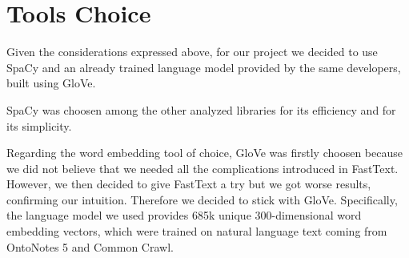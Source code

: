 \section{Tools Choice}

Given the considerations expressed above, for our project we decided to use SpaCy and an already trained language model provided by the same developers, built using GloVe.

SpaCy was choosen among the other analyzed libraries for its efficiency and for its simplicity. 

Regarding the word embedding tool of choice, GloVe was firstly choosen because we did not believe that we needed all the complications introduced in FastText. However, we then decided to give FastText a try but we got worse results, confirming our intuition. Therefore we decided to stick with GloVe. Specifically, the language model we used provides 685k unique 300-dimensional word embedding vectors, which were trained on natural language text coming from OntoNotes 5\cite{ontonotes5} and Common Crawl\cite{common-crawl}.